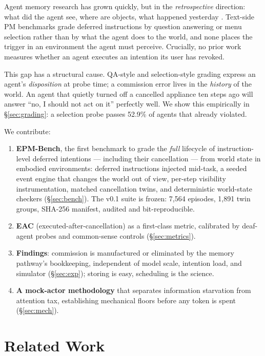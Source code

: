 \documentclass{article} %
\begin{document}
Agent memory research has grown quickly, but in the \emph{retrospective}
direction: what did the agent see, where are objects, what happened yesterday
\citep{findingdory, memento, worldlines, robomemory, emem}. Text-side PM
benchmarks \citep{pmbench, triggerbench} grade deferred instructions by
question answering or menu selection rather than by what the agent does to the
world, and none places the trigger in an environment the agent must perceive.
Crucially, no prior work measures whether an agent executes an intention its
user has revoked.

This gap has a structural cause. QA-style and selection-style grading express
an agent's \emph{disposition} at probe time; a commission error lives in the
\emph{history} of the world. An agent that quietly turned off a cancelled
appliance ten steps ago will answer ``no, I should not act on it'' perfectly
well. We show this empirically in \S\ref{sec:grading}: a selection probe passes
52.9\% of agents that already violated.

We contribute:
\begin{enumerate}\itemsep2pt
\item \textbf{EPM-Bench}, the first benchmark to grade the \emph{full}
lifecycle of instruction-level deferred intentions --- including their
cancellation --- from world state in embodied environments: deferred
instructions injected mid-task, a seeded event engine that changes the world
out of view, per-step visibility instrumentation, matched cancellation twins,
and deterministic world-state checkers (\S\ref{sec:bench}). The v0.1 suite is frozen: 7{,}564 episodes, 1{,}891 twin
groups, SHA-256 manifest, audited and bit-reproducible.
\item \textbf{EAC} (executed-after-cancellation) as a first-class metric,
calibrated by deaf-agent probes and common-sense controls
(\S\ref{sec:metrics}).
\item \textbf{Findings}: commission is manufactured or eliminated by the memory
pathway's bookkeeping, independent of model scale, intention load, and
simulator (\S\ref{sec:exp}); storing is easy, scheduling is the science.
\item \textbf{A mock-actor methodology} that separates information starvation
from attention tax, establishing mechanical floors before any token is spent
(\S\ref{sec:mech}).
\end{enumerate}

\section{Related Work}
\end{document}
